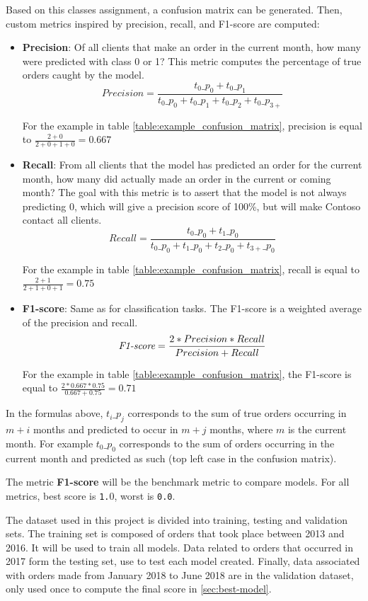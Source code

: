 Based on this classes assignment, a confusion matrix can be generated. Then, custom metrics inspired by precision, recall, and F1-score are computed:
\begin{itemize}
    \item \textbf{Precision}: Of all clients that make an order in the current month, how many were predicted with class 0 or 1? This metric computes the percentage of true orders caught by the model. 
    $$ Precision = \frac{t_0\_p_0 + t_0\_p_1}{t_0\_p_0 + t_0\_p_1 + t_0\_p_2 + t_0\_p_{3+}} $$
    
    For the example in table \ref{table:example_confusion_matrix}, precision is equal to $\frac{2+0}{2+0+1+0} = 0.667$
    
    \item \textbf{Recall}: From all clients that the model has predicted an order for the current month, how many did actually made an order in the current or coming month? The goal with this metric is to assert that the model is not always predicting 0, which will give a precision score of 100\%, but will make Contoso contact all clients. 
    $$ Recall = \frac{t_0\_p_0 + t_1\_p_0}{t_0\_p_0 + t_1\_p_0 + t_2\_p_0 + t_{3+}\_p_0} $$
    
    For the example in table \ref{table:example_confusion_matrix}, recall is equal to $\frac{2+1}{2+1+0+1} = 0.75$
    
    \item \textbf{F1-score}: Same as for classification tasks. The F1-score is a weighted average of the precision and recall.
    $$ \operatorname{\textit{F1-score}} = \frac{2*Precision*Recall}{Precision+Recall} $$

    For the example in table \ref{table:example_confusion_matrix}, the F1-score is equal to $\frac{2*0.667*0.75}{0.667+0.75} = 0.71$
\end{itemize}

In the formulas above, $t_i\_p_j$ corresponds to the sum of true orders occurring in $m+i$ months and predicted to occur in $m+j$ months, where $m$ is the current month. For example $t_0\_p_0$ corresponds to the sum of orders occurring in the current month and predicted as such (top left case in the confusion matrix).

The metric \textbf{F1-score} will be the benchmark metric to compare models. For all metrics, best score is \texttt{1.}0, worst is \texttt{0.0}.

The dataset used in this project is divided into training, testing and validation sets. The training set is composed of orders that took place between 2013 and 2016. It will be used to train all models. Data related to orders that occurred in 2017 form the testing set, use to test each model created. Finally, data associated with orders made from January 2018 to June 2018 are in the validation dataset, only used once to compute the final score in \ref{sec:best-model}.


